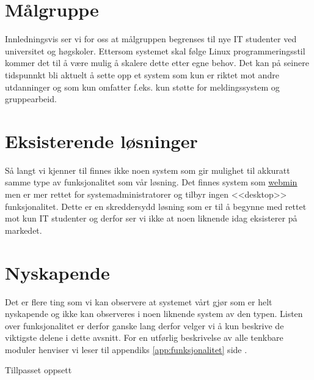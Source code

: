 \section{Målgruppe} \label{sec:målgruppe}
Innledningsvis ser vi for oss at målgruppen begrenses til nye IT studenter ved universitet og høgskoler. Ettersom systemet skal følge Linux programmeringsstil\cite{book:unixprog} kommer det til å være mulig å skalere dette etter egne behov. Det kan på seinere tidspunnkt bli aktuelt å sette opp et system som kun er riktet mot andre utdanninger og som kun omfatter f.eks. kun støtte for meldingssystem og gruppearbeid.

\section{Eksisterende løsninger}
Så langt vi kjenner til finnes ikke noen system som gir mulighet til akkuratt samme type av funksjonalitet som vår løsning. Det finnes system som \href{http://en.wikipedia.org/wiki/Webmin}{\underline{webmin}} men er mer rettet for systemadministratorer og tilbyr ingen <<desktop>> funksjonalitet. Dette er en skreddersydd løsning som er til å begynne med rettet mot kun IT studenter og derfor ser vi ikke at noen liknende idag eksisterer på markedet. 

\section{Nyskapende}
Det er flere ting som vi kan observere at systemet vårt gjør som er helt nyskapende og ikke kan observeres i noen liknende system av den typen. Listen over funksjonalitet er derfor ganske lang derfor velger vi å kun beskrive de viktigste delene i dette avsnitt. For en utførlig beskrivelse av alle tenkbare moduler henviser vi leser til appendiks \ref{app:funksjonalitet} side \pageref{app:funksjonalitet}.
\begin{description}
\item[Tillpasset oppsett]
\end{description}